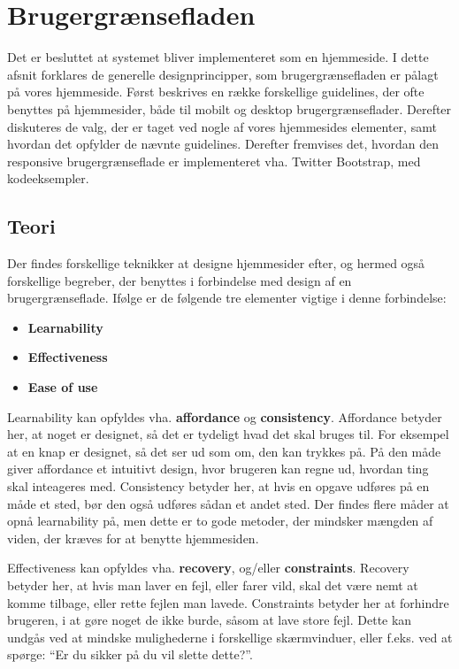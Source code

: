 \section{Brugergrænsefladen} \label{brugergraenseflade}
Det er besluttet at systemet bliver implementeret som en hjemmeside.
I dette afsnit forklares de generelle designprincipper, som brugergrænsefladen er pålagt på vores hjemmeside.
Først beskrives en række forskellige guidelines, der ofte benyttes på hjemmesider, både til mobilt og desktop brugergrænseflader.
Derefter diskuteres de valg, der er taget ved nogle af vores hjemmesides elementer, samt hvordan det opfylder de nævnte guidelines.
Derefter fremvises det, hvordan den responsive brugergrænseflade er implementeret vha. Twitter Bootstrap, med kodeeksempler. 

\subsection{Teori}
Der findes forskellige teknikker at designe hjemmesider efter, og hermed også forskellige begreber, der benyttes i forbindelse med design af en brugergrænseflade.
Ifølge \citep{DIS2014} er de følgende tre elementer vigtige i denne forbindelse:
\begin{itemize}[nolistsep,noitemsep]
	\item \textbf{Learnability}
	\item \textbf{Effectiveness}
	\item \textbf{Ease of use}
\end{itemize}

Learnability kan opfyldes vha. \textbf{affordance} og \textbf{consistency}.
Affordance betyder her, at noget er designet, så det er tydeligt hvad det skal bruges til.
For eksempel at en knap er designet, så det ser ud som om, den kan trykkes på. 
På den måde giver affordance et intuitivt design, hvor brugeren kan regne ud, hvordan ting skal inteageres med.
Consistency betyder her, at hvis en opgave udføres på en måde et sted, bør den også udføres sådan et andet sted.
Der findes flere måder at opnå learnability på, men dette er to gode metoder, der mindsker mængden af viden, der kræves for at benytte hjemmesiden.

Effectiveness kan opfyldes vha. \textbf{recovery}, og/eller \textbf{constraints}.
Recovery betyder her, at hvis man laver en fejl, eller farer vild, skal det være nemt at komme tilbage, eller rette fejlen man lavede.
Constraints betyder her at forhindre brugeren, i at gøre noget de ikke burde, såsom at lave store fejl. 
Dette kan undgås ved at mindske mulighederne i forskellige skærmvinduer, eller f.eks. ved at spørge: ``Er du sikker på du vil slette dette?''.

